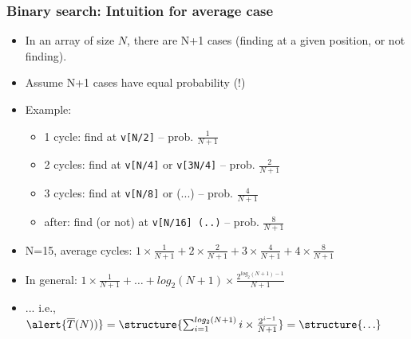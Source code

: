 \documentclass[aspectratio=169]{beamer}
\begin{document}
\begin{frame}\frametitle{Binary search: Intuition for average case}
  \begin{itemize}
    \item In an array of size $N$, there are N+1 cases (finding at a given position, or not finding).
    \item Assume N+1 cases have equal probability (!)
    \item Example: 
    \begin{itemize}
      \item \alert{1 cycle:} find at \texttt{v[N/2]}  -- prob. $\frac{1}{N+1}$
      \item \alert{2 cycles:} find at \texttt{v[N/4]} or \texttt{v[3N/4]} -- prob. $\frac{2}{N+1}$
      \item \alert{3 cycles:} find at \texttt{v[N/8]} or (...) -- prob. $\frac{4}{N+1}$
      \item \alert{after:} find (or not) at \texttt{v[N/16] (..)} -- prob. $\frac{8}{N+1}$
    \end{itemize}
    \item N=15, average cycles: $1\times\frac{1}{N+1} + 2\times\frac{2}{N+1} + 3\times\frac{4}{N+1} + 
            4\times\frac{8}{N+1}$
    \item In general: $1\times\frac{1}{N+1} + \ldots + log_2(N+1)\times\frac{2^{log_2(N+1)-1}}{N+1}$
    \item ... i.e.,
      $\alert{\overline T(N))}
      = \structure{\sum_{i=1}^{log_2(N+1)} i\times \frac{2^{i-1}}{N+1}}
      = \structure{\ldots}$
  \end{itemize}
\end{frame}
\end{document}
